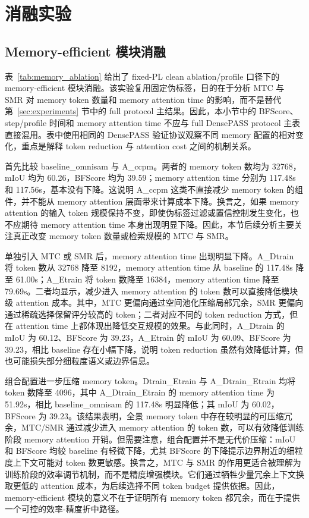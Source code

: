 \section{消融实验}
\label{sec:ablation}

\subsection{Memory-efficient 模块消融}


表~\ref{tab:memory_ablation} 给出了 fixed-PL clean ablation/profile 口径下的 memory-efficient 模块消融。该实验复用固定伪标签，目的在于分析 MTC 与 SMR 对 memory token 数量和 memory attention time 的影响，而不是替代第~\ref{sec:experiments} 节中的 full protocol 主结果。因此，本小节中的 BFScore、step/profile 时间和 memory attention time 不应与 full DensePASS protocol 主表直接混用。表中使用相同的 DensePASS 验证协议观察不同 memory 配置的相对变化，重点是解释 token reduction 与 attention cost 之间的机制关系。

首先比较 baseline\_omnisam 与 A\_ccpm。两者的 memory token 数均为 32768，mIoU 均为 60.26，BFScore 均为 39.59；memory attention time 分别为 117.48s 和 117.56s，基本没有下降。这说明 A\_ccpm 这类不直接减少 memory token 的组件，并不能从 memory attention 层面带来计算成本下降。换言之，如果 memory attention 的输入 token 规模保持不变，即使伪标签过滤或置信控制发生变化，也不应期待 memory attention time 本身出现明显下降。因此，本节后续分析主要关注真正改变 memory token 数量或检索规模的 MTC 与 SMR。

单独引入 MTC 或 SMR 后，memory attention time 出现明显下降。A\_Dtrain 将 token 数从 32768 降至 8192，memory attention time 从 baseline 的 117.48s 降至 61.00s；A\_Etrain 将 token 数降至 16384，memory attention time 降至 79.69s。二者均显示，减少进入 memory attention 的 token 数可以直接降低模块级 attention 成本。其中，MTC 更偏向通过空间池化压缩局部冗余，SMR 更偏向通过稀疏选择保留评分较高的 token；二者对应不同的 token reduction 方式，但在 attention time 上都体现出降低交互规模的效果。与此同时，A\_Dtrain 的 mIoU 为 60.12、BFScore 为 39.23，A\_Etrain 的 mIoU 为 60.09、BFScore 为 39.23，相比 baseline 存在小幅下降，说明 token reduction 虽然有效降低计算，但也可能损失部分细粒度语义或边界信息。

组合配置进一步压缩 memory token。Dtrain\_Etrain 与 A\_Dtrain\_Etrain 均将 token 数降至 4096，其中 A\_Dtrain\_Etrain 的 memory attention time 为 51.92s，相比 baseline\_omnisam 的 117.48s 明显降低；其 mIoU 为 60.02，BFScore 为 39.23。该结果表明，全景 memory token 中存在较明显的可压缩冗余，MTC/SMR 通过减少进入 memory attention 的 token 数，可以有效降低训练阶段 memory attention 开销。但需要注意，组合配置并不是无代价压缩：mIoU 和 BFScore 均较 baseline 有轻微下降，尤其 BFScore 的下降提示边界附近的细粒度上下文可能对 token 数更敏感。换言之，MTC 与 SMR 的作用更适合被理解为训练阶段的效率调节机制，而不是精度增强模块。它们通过牺牲少量冗余上下文换取更低的 attention 成本，为后续选择不同 token budget 提供依据。因此，memory-efficient 模块的意义不在于证明所有 memory token 都冗余，而在于提供一个可控的效率-精度折中路径。

